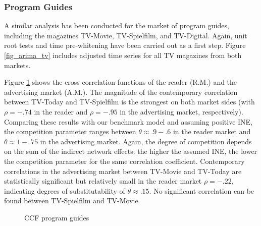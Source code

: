 \documentclass[12pt,a4paper,notitlepage]{article}
\begin{document}
\subsubsection{Program Guides}

A similar analysis has been conducted for the market of program guides, including the magazines TV-Movie, TV-Spielfilm, and TV-Digital. 
Again, unit root tests and time pre-whitening have been carried out as a first step. Figure \ref{fig_arima_tv} includes adjusted time series for all TV magazines from both markets.  

Figure \ref{fig_ccf_tv} shows the cross-correlation functions of the reader (R.M.) and the advertising market (A.M.). The magnitude of the contemporary correlation between TV-Today and TV-Spielfilm is the strongest on both market sides (with $\rho=-.74$ in the reader and $\rho=-.95$ in the advertising market, respectively). Comparing these results with our benchmark model and assuming positive INE, the competition parameter ranges between $\theta\approx.9-.6$ in the reader market and $\theta\approx1-.75$ in the advertising market. Again, the degree of competition depends on the sum of the indirect network effects: the higher the assumed INE, the lower the competition parameter for the same correlation coefficient. Contemporary correlations in the advertising market between TV-Movie and TV-Today are statistically significant but relatively small in the reader market $\rho=-.22$, indicating degrees of substitutability of $\theta\approx.15$. No significant correlation can be found between TV-Spielfilm and TV-Movie.

\begin{figure}[H]\centering
\caption{CCF program guides}
	\label{fig_ccf_tv}
\end{figure}
\end{document}
